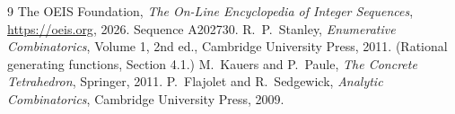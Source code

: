 \documentclass[11pt,a4paper]{article}
\theoremstyle{plain}
\theoremstyle{definition}
\begin{document}
\begin{thebibliography}{9}
 The OEIS Foundation, \emph{The On-Line Encyclopedia of Integer
Sequences}, \url{https://oeis.org}, 2026. Sequence A202730.
 R.~P.~Stanley, \emph{Enumerative Combinatorics}, Volume 1, 2nd ed.,
Cambridge University Press, 2011. (Rational generating functions, Section 4.1.)
 M.~Kauers and P.~Paule, \emph{The Concrete Tetrahedron}, Springer, 2011.
 P.~Flajolet and R.~Sedgewick, \emph{Analytic Combinatorics}, Cambridge
University Press, 2009.
\end{thebibliography}
\end{document}

